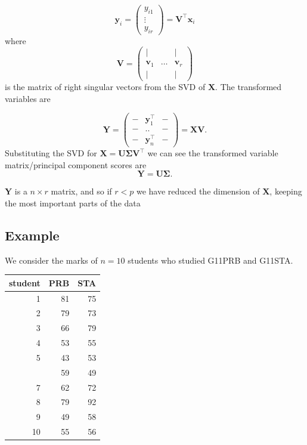 \documentclass[]{book}
\theoremstyle{definition}
\theoremstyle{definition}
\theoremstyle{definition}
\theoremstyle{remark}
\begin{document}
\[\mathbf y_i= \left(\begin{array}{c}y_{i1}\\\vdots\\y_{ir}\end{array}\right)= \mathbf V^\top \mathbf x_i\]
where \[\mathbf V= \left(\begin{array}{ccc} | &&|\\\mathbf v_1&\ldots& \mathbf v_r\\  | &&|\end{array}\right)\]
is the matrix of right singular vectors from the SVD of \(\mathbf X\).
The transformed variables are

\[\mathbf Y= \left( \begin{array}{ccc}
- &\mathbf y_1^\top&-\\
- &..&-\\
- &\mathbf y_n^\top&-
\end{array}\right ) = \mathbf X\mathbf V.
\]
Substituting the SVD for \(\mathbf X= \mathbf U\boldsymbol{\Sigma}\mathbf V^\top\) we can see the transformed variable matrix/principal component scores are
\[\mathbf Y= \mathbf U\boldsymbol{\Sigma}.\]

\(\mathbf Y\) is a \(n \times r\) matrix, and so if \(r<p\) we have reduced the dimension of \(\mathbf X\), keeping the most important parts of the data

\hypertarget{example}{%
\subsection{Example}\label{example}}

We consider the marks of \(n=10\) students who studied G11PRB and G11STA.

\begin{table}[H]
\centering
\begin{tabular}{rrr}
\toprule
student & PRB & STA\\
\midrule
1 & 81 & 75\\
2 & 79 & 73\\
3 & 66 & 79\\
4 & 53 & 55\\
5 & 43 & 53\\
\addlinespace
6 & 59 & 49\\
7 & 62 & 72\\
8 & 79 & 92\\
9 & 49 & 58\\
10 & 55 & 56\\
\bottomrule
\end{tabular}
\end{table}
\end{document}
